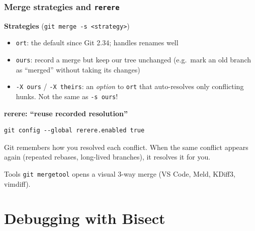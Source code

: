 \documentclass[aspectratio=169,10pt,compress]{beamer}
\newcommand{\cmd}[1]{\texttt{\color{gitred}#1}}
\begin{document}
\begin{frame}[t,fragile] \frametitle{Merge strategies and \texttt{rerere}}
  \textbf{Strategies} (\cmd{git merge -s <strategy>})
  \begin{itemize}
    \item \texttt{ort}: the default since Git 2.34; handles renames well
    \item \texttt{ours}: record a merge but keep our tree unchanged
          (e.g.\ mark an old branch as ``merged'' without taking its changes)
    \item \texttt{-X ours} / \texttt{-X theirs}: an \emph{option} to \texttt{ort} that
          auto-resolves only conflicting hunks. Not the same as \texttt{-s ours}!
  \end{itemize}

  \vspace{0.3em}
  \textbf{rerere: ``reuse recorded resolution''}
\begin{lstlisting}
git config --global rerere.enabled true
\end{lstlisting}
  \small
  Git remembers how you resolved each conflict. When the same conflict appears
  again (repeated rebases, long-lived branches), it resolves it for you.

  \begin{block}{Tools}
    \cmd{git mergetool} opens a visual 3-way merge (VS Code, Meld, KDiff3, vimdiff).
  \end{block}
\end{frame}

\section[Bisect]{Debugging with Bisect}
\end{document}
